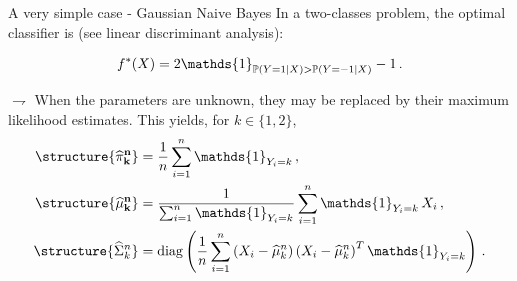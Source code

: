 \documentclass[xcolor={usenames,dvipsnames},handout]{beamer}
\begin{document}
\begin{frame}{A very simple case - Gaussian Naive Bayes}
In a two-classes problem, the optimal classifier is (\alert{see linear discriminant analysis}):

\begin{align*}
f^*(X) = 2\mathds{1}_{\P(Y= 1| X)>\P(Y= -1| X)}-1\,.
\end{align*}

\vspace{.2cm}

$\rightharpoondown$ When the parameters are unknown, they may be replaced by their \alert{maximum likelihood estimates}. This yields, for $k\in\{1,2\}$,  
\begin{align*}
\structure{{\bf \widehat \pi_k^n}} &= \frac{1}{n}\sum_{i=1}^n\mathds{1}_{Y_i=k}\,,\\
\structure{{\bf \widehat \mu_k^n}} &= \frac{1}{\sum_{i=1}^n\mathds{1}_{Y_i=k}}\sum_{i=1}^n\mathds{1}_{Y_i=k}\,X_i\,,\\
\structure{{\widehat\Sigma_k^n}} &= \mathrm{diag}\left(\frac{1}{n}\sum_{i=1}^n \left(X_i - \widehat \mu_{k}^n\right)\left(X_i - \widehat \mu_{k}^n\right)^T\mathds{1}_{Y_i=k}\right)\,.
\end{align*}

\end{frame}


%
%
%
%
%
%
%
%
%
%
%
\end{document}

